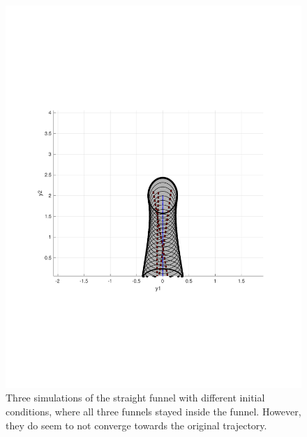 \begin{figure}
  \includegraphics[scale=0.5]{figures/funnel/straight_simulation}
  \caption{Three simulations of the straight funnel with different initial
    conditions, where all three funnels stayed inside the funnel. However, they
    do seem to not converge towards the original trajectory.}
\end{figure}


